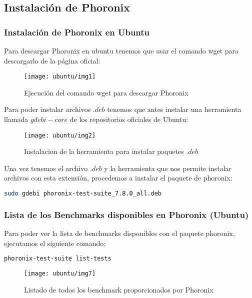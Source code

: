 \subsection{Instalación de Phoronix}

\subsubsection{Instalación de Phoronix en Ubuntu}

Para descargar Phoronix en ubuntu tenemos que usar el comando wget para descargarlo de la página oficial:

\begin{figure}[H]
    \centering
    \texttt{[image: ubuntu/img1]}
    \caption{Ejecución del comando wget para descargar Phoronix}
\end{figure}

Para poder instalar archivos $.deb$ tenemos que antes instalar una herramienta llamada $gdebi-core$ de los repositorios oficiales de Ubuntu:

\begin{figure}[H]
    \centering
    \texttt{[image: ubuntu/img2]}
    \caption{Instalacion de la herramienta para instalar paquetes $.deb$}
\end{figure}

Una vez tenemos el archivo $.deb$ y la herramienta que nos permite instalar archivos con esta extensión, procedemos a instalar el paquete de phoronix:

\begin{lstlisting}[language=bash]
    sudo gdebi phoronix-test-suite_7.8.0_all.deb 
\end{lstlisting}

\subsubsection{Lista de los Benchmarks disponibles en Phoronix (Ubuntu)}

Para poder ver la lista de benchmarks disponibles con el paquete phoronix, ejecutamos el siguiente comando:

\begin{lstlisting}[language=bash]
    phoronix-test-suite list-tests
\end{lstlisting}

\begin{figure}[H]
    \centering
    \texttt{[image: ubuntu/img7]}
    \caption{Listado de todos los benchmark proporcionados por Phoronix}
\end{figure}


